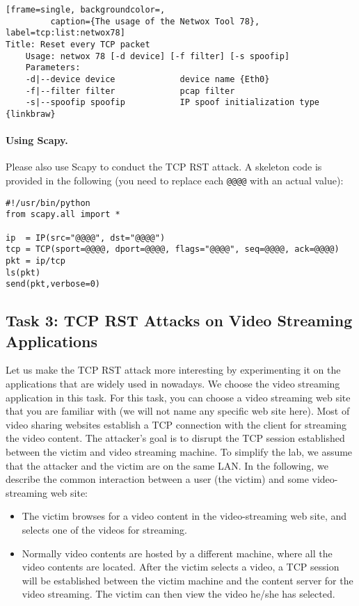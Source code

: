 \begin{lstlisting}[frame=single, backgroundcolor=,
         caption={The usage of the Netwox Tool 78}, label=tcp:list:netwox78]
Title: Reset every TCP packet
    Usage: netwox 78 [-d device] [-f filter] [-s spoofip]
    Parameters:
    -d|--device device             device name {Eth0}
    -f|--filter filter             pcap filter
    -s|--spoofip spoofip           IP spoof initialization type {linkbraw}
\end{lstlisting}


\paragraph{Using Scapy.} Please also use Scapy to conduct the TCP RST attack. 
A skeleton code is provided in the following (you need to replace each
\texttt{@@@@} with an actual value):  


\begin{lstlisting}
#!/usr/bin/python
from scapy.all import *

ip  = IP(src="@@@@", dst="@@@@")
tcp = TCP(sport=@@@@, dport=@@@@, flags="@@@@", seq=@@@@, ack=@@@@)
pkt = ip/tcp
ls(pkt)
send(pkt,verbose=0)
\end{lstlisting}
 




\subsection {Task 3: TCP RST Attacks on Video Streaming Applications}

Let us make the TCP RST attack more interesting by experimenting it on 
the applications that are widely used in nowadays.
We choose the video streaming application in 
this task. For this task, you can choose a video streaming web site that you 
are familiar with (we will not name any specific web site here).  Most of
video sharing websites establish a TCP connection with the client for 
streaming the video content. The attacker's goal is to disrupt the TCP session 
established between the victim and video streaming machine. To 
simplify the lab, we assume that the attacker and the victim are on the 
same LAN. In the following, we describe the common interaction between
a user (the victim) and some video-streaming web site:

\begin{itemize}
\item The victim browses for a video content in the video-streaming web 
site, and selects one of the videos for streaming. 

\item Normally video contents are hosted by a different machine,
where all the video contents are located. After the victim selects 
a video, a TCP session will be established between the victim 
machine and the content server for the video streaming.
The victim can then view the video he/she has selected.
\end{itemize}

